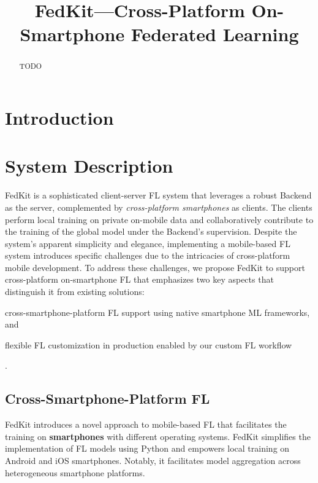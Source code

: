 \documentclass[letterpaper]{article} %
\title{FedKit---Cross-Platform On-Smartphone Federated Learning}
\author{}
\begin{document}
\maketitle

\begin{abstract}
    TODO
\end{abstract}

\section{Introduction}


\section{System Description}

FedKit is a sophisticated client-server FL system that leverages a robust Backend as the server, complemented by \textit{cross-platform smartphones} as clients.
The clients perform local training on private on-mobile data and collaboratively contribute to the training of the global model under the Backend's supervision.
Despite the system's apparent simplicity and elegance, implementing a mobile-based FL system introduces specific challenges due to the intricacies of cross-platform mobile development.
To address these challenges, we propose FedKit to support cross-platform on-smartphone FL that emphasizes two key aspects that distinguish it from existing solutions:
\begin{enumerate*}[label=\arabic*)]
    \item cross-smartphone-platform FL support using
        native smartphone ML frameworks, and
    \item flexible FL customization in production enabled by
        our custom FL workflow
\end{enumerate*}.

\subsection{Cross-Smartphone-Platform FL}

FedKit introduces a novel approach to mobile-based FL that facilitates the training on \textbf{smartphones} with different operating systems. 
FedKit simplifies the implementation of FL models using Python and empowers local training on Android and iOS smartphones. Notably, it facilitates model aggregation across heterogeneous smartphone platforms.
\end{document}
